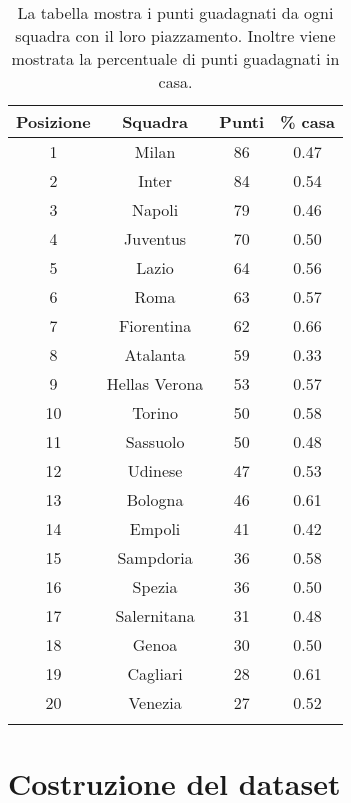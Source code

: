	\begin{table}[!htb]%

	\renewcommand{\arraystretch}{1.7}
	\centering
	\begin{tabular}{c c c c}
		\hline	

		\textbf{Posizione} & \textbf{Squadra} & \textbf{Punti} & \textbf{ \% casa}  \\	
		\hline			
		1 & Milan & 86 & 0.47\\
		2 & Inter & 84 & 0.54\\
		3 & Napoli & 79 & 0.46\\
		4 & Juventus & 70 & 0.50\\
		5 & Lazio & 64 & 0.56\\
		6 & Roma & 63 & 0.57\\
		7 & Fiorentina & 62 & 0.66\\
		8 & Atalanta & 59 & 0.33\\
		9 & Hellas Verona & 53 & 0.57\\
		10 & Torino & 50 & 0.58\\
		11 & Sassuolo & 50 & 0.48\\
		12 & Udinese & 47 & 0.53\\
		13 & Bologna & 46 & 0.61\\
		14 & Empoli & 41 & 0.42\\
		15 & Sampdoria & 36 & 0.58\\
		16 & Spezia & 36 & 0.50\\
		17 & Salernitana & 31 & 0.48\\
		18 & Genoa & 30 & 0.50\\
		19 & Cagliari & 28 & 0.61\\
		20 & Venezia & 27 & 0.52\\
			\hline
		 & & & \\
	
	\end{tabular} \hbox{}

	\caption{La tabella mostra i punti guadagnati da ogni squadra con il loro piazzamento. Inoltre viene mostrata la percentuale di punti guadagnati in casa.} \label{tab:ranking}
\end{table}

\section{Costruzione del dataset}

